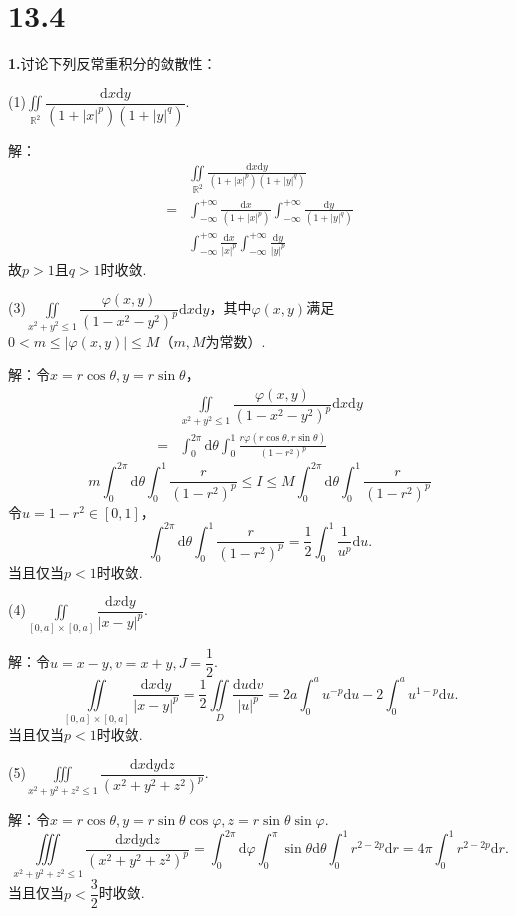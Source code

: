 \documentclass[12pt, a4paper]{article}
\newcommand{\RR}{\mathbb{R}}
\newcommand{\dif}{\mathrm{d}}
\begin{document}
\section*{13.4}
\textbf{1.}讨论下列反常重积分的敛散性：

(1)\(\iint\limits_{\RR^2} \dfrac{\dif x \dif y}{(1 + |x|^p)(1 + |y|^q)}\).

解：
\begin{align*}
&\iint\limits_{\RR^2} \frac{\dif x \dif y}{(1 + |x|^p)(1 + |y|^q)} \\
= &\int_{-\infty}^{+\infty} \frac{\dif x}{(1 + |x|^p)} \int_{-\infty}^{+\infty} \frac{\dif y}{(1 + |y|^q)} \\
~ &\int_{-\infty}^{+\infty} \frac{\dif x}{|x|^p} \int_{-\infty}^{+\infty} \frac{\dif y}{|y|^p}
\end{align*}
故\(p > 1\)且\(q > 1\)时收敛.

(3)\(\iint\limits_{x^2 + y^2 \leq 1} \dfrac{\varphi(x, y)}{(1 - x^2 - y^2)^p} \dif x \dif y\)，其中\(\varphi(x, y)\)满足\\
\(0 < m \leq |\varphi(x, y)| \leq M\)（\(m, M\)为常数）.

解：令\(x = r\cos\theta, y = r\sin\theta\)，
\begin{align*}
&\iint\limits_{x^2 + y^2 \leq 1} \dfrac{\varphi(x, y)}{(1 - x^2 - y^2)^p} \dif x \dif y \\
= &\int_{0}^{2\pi} \dif \theta \int_0^1 \frac{r\varphi(r\cos\theta, r\sin\theta)}{(1 - r^2)^p}
\end{align*}
\[m \int_{0}^{2\pi} \dif \theta \int_0^1 \frac{r}{(1 - r^2)^p} \leq I \leq M \int_{0}^{2\pi} \dif \theta \int_0^1 \frac{r}{(1 - r^2)^p}\]
令\(u = 1 - r^2 \in [0, 1]\)，
\[\int_{0}^{2\pi} \dif \theta \int_0^1 \frac{r}{(1 - r^2)^p} = \frac{1}{2} \int_0^1 \frac{1}{u^p} \dif u.\]
当且仅当\(p < 1\)时收敛.

(4)\(\iint\limits_{[0, a] \times [0, a]} \dfrac{\dif x \dif y}{|x - y|^p}\).

解：令\(u = x - y, v = x + y, J = \dfrac{1}{2}\).
\[\iint\limits_{[0, a] \times [0, a]} \frac{\dif x \dif y}{|x - y|^p} = \frac{1}{2} \iint\limits_D \frac{\dif u \dif v}{|u|^p} = 2a \int_0^a u^{-p} \dif u - 2 \int_0^a u^{1 - p} \dif u.\]
当且仅当\(p < 1\)时收敛.

(5)\(\iiint\limits_{x^2 + y^2 + z^2 \leq 1} \dfrac{\dif x \dif y \dif z}{(x^2 + y^2 + z^2)^p}\).

解：令\(x = r\cos\theta, y = r\sin\theta\cos\varphi, z = r\sin\theta\sin\varphi\).
\[\iiint\limits_{x^2 + y^2 + z^2 \leq 1} \frac{\dif x \dif y \dif z}{(x^2 + y^2 + z^2)^p} = \int_{0}^{2\pi} \dif \varphi \int_0^\pi \sin\theta \dif \theta \int_0^1 r^{2 - 2p} \dif r = 4\pi \int_0^1 r^{2 - 2p} \dif r.\]
当且仅当\(p < \dfrac{3}{2}\)时收敛.
\end{document}
